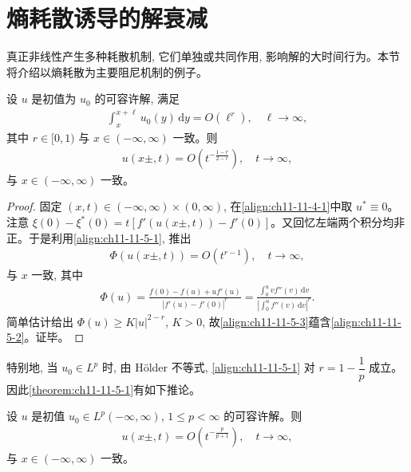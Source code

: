 \documentclass[../../main.tex]{subfiles}
\begin{document}
\section{熵耗散诱导的解衰减}\label{section:ch11-熵耗散诱导的解衰减}

真正非线性产生多种耗散机制, 它们单独或共同作用, 影响解的大时间行为。本节将介绍以熵耗散为主要阻尼机制的例子。

\begin{theorem}\label{theorem:ch11-11-5-1}
设 $u$ 是初值为 $u_0$ 的可容许解, 满足
\begin{align}
\int_x^{x+\ell}u_0(y)\,\mathrm{d}y=O(\ell^r),\quad \ell\to\infty,\label{align:ch11-11-5-1}
\end{align}
其中 $r\in[0,1)$ 与 $x\in(-\infty,\infty)$ 一致。则
\begin{align}
u(x\pm,t)=O\left(t^{-\frac{1-r}{2-r}}\right),\quad t\to\infty,\label{align:ch11-11-5-2}
\end{align}
与 $x\in(-\infty,\infty)$ 一致。
\end{theorem}

\begin{proof}
固定 $(x,t)\in(-\infty,\infty)\times(0,\infty)$, 在\eqref{align:ch11-11-4-1}中取 $u^*\equiv0$。注意 $\xi(0)-\xi^*(0)=t[f'(u(x\pm,t))-f'(0)]$。又回忆左端两个积分均非正。于是利用\eqref{align:ch11-11-5-1}, 推出
\begin{align}
\Phi(u(x\pm,t))=O(t^{r-1}),\quad t\to\infty,\label{align:ch11-11-5-3}
\end{align}
与 $x$ 一致, 其中
\begin{align}
\Phi(u)=\frac{f(0)-f(u)+uf'(u)}{|f'(u)-f'(0)|^r}=\frac{\int_0^u vf''(v)\,\mathrm{d}v}{\left|\int_0^u f''(v)\,\mathrm{d}v\right|^r}.\label{align:ch11-11-5-4}
\end{align}
简单估计给出 $\Phi(u)\geqslant K|u|^{2-r}$, $K>0$, 故\eqref{align:ch11-11-5-3}蕴含\eqref{align:ch11-11-5-2}。证毕。
\end{proof}

特别地, 当 $u_0\in L^p$ 时, 由 Hölder 不等式, \eqref{align:ch11-11-5-1} 对 $r=1-\dfrac1p$ 成立。因此\cref{theorem:ch11-11-5-1}有如下推论。

\begin{theorem}\label{theorem:ch11-11-5-2}
设 $u$ 是初值 $u_0\in L^p(-\infty,\infty)$, $1\leqslant p<\infty$ 的可容许解。则
\begin{align}
u(x\pm,t)=O\left(t^{-\frac{p}{p+1}}\right),\quad t\to\infty,\label{align:ch11-11-5-5}
\end{align}
与 $x\in(-\infty,\infty)$ 一致。
\end{theorem}
\end{document}
